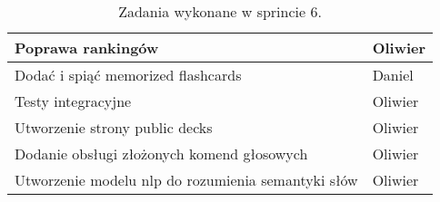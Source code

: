 \begin{table}[H]
\begin{tabularx}{\textwidth}{|p{}|X|}
    \hline
    [WEB] Poprawa rankingów & Oliwier \\
    \hline
    [MOBILE] Dodać i spiąć memorized flashcards & Daniel \\
    \hline
    [BACKEND] Testy integracyjne & Oliwier \\
    \hline
    [WEB] Utworzenie strony public decks & Oliwier \\
    \hline
    [WEB] Dodanie obsługi złożonych komend głosowych & Oliwier \\
    \hline
    [BACKEND] Utworzenie modelu nlp do rozumienia semantyki słów & Oliwier \\
    \hline
\end{tabularx}
                    \caption{Zadania wykonane w sprincie 6.}
\end{table}


